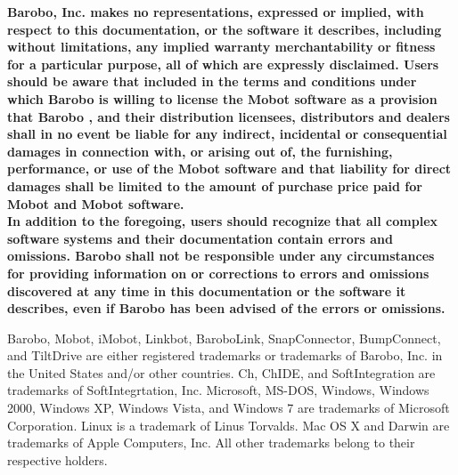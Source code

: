 \noindent
{\bf 
Barobo, Inc.
makes no representations, expressed or implied, with respect
to this documentation, or the software
it describes, including without limitations, any implied
warranty merchantability or fitness for a particular
purpose, all of which are expressly disclaimed.
Users should be aware that included in the terms and conditions
under which  Barobo is willing to license the Mobot software
as a provision that
Barobo , and their distribution
licensees, distributors and dealers shall in no event
be liable for any indirect, incidental or consequential
damages in connection with, 
or arising out of, the furnishing, performance,
or use of the Mobot software
and that liability for direct damages shall be limited
to the amount of purchase price paid for Mobot and Mobot software.\\

\noindent
In addition to the foregoing, users should recognize
that all complex software systems and their documentation
contain errors and omissions. Barobo
shall not be responsible under any circumstances
for providing information on or corrections to errors
and omissions discovered at any time in this documentation
or the software it describes,
even if Barobo has
been advised of the errors or omissions.\\
}


\noindent
Barobo, Mobot, iMobot, Linkbot, BaroboLink, SnapConnector, BumpConnect, and TiltDrive
are either
registered trademarks or trademarks of Barobo, Inc.
in the United States and/or other countries.
Ch, ChIDE, and  SoftIntegration 
are trademarks of SoftIntegrtation, Inc.
Microsoft, MS-DOS, Windows, Windows 2000, Windows XP, 
Windows Vista, and Windows 7
are trademarks of Microsoft Corporation.
Linux is a trademark of Linus Torvalds.
Mac OS X and Darwin are trademarks of Apple Computers, Inc.
All other trademarks belong to their respective holders.
